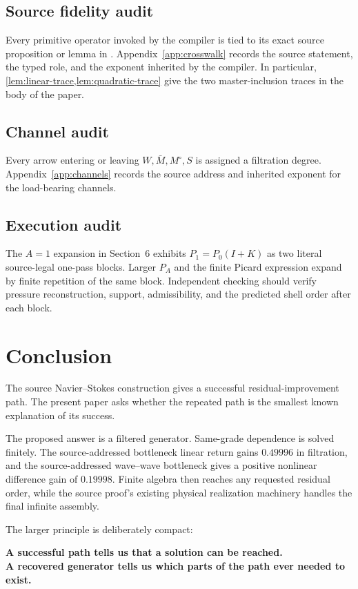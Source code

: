 \documentclass[11pt]{article}
\numberwithin{equation}{section}
\theoremstyle{highend}
\theoremstyle{definition}
\begin{document}
\subsection{Source fidelity audit}
Every primitive operator invoked by the compiler is tied to its exact source proposition or lemma in \cite{OpenAI2026NS}. Appendix~\ref{app:crosswalk} records the source statement, the typed role, and the exponent inherited by the compiler. In particular, \cref{lem:linear-trace,lem:quadratic-trace} give the two master-inclusion traces in the body of the paper.

\subsection{Channel audit}
Every arrow entering or leaving $W,\bar M,M^\circ,S$ is assigned a filtration degree. Appendix~\ref{app:channels} records the source address and inherited exponent for the load-bearing channels.

\subsection{Execution audit}
The $A=1$ expansion in Section~6 exhibits $P_1=P_0(I+K)$ as two literal source-legal one-pass blocks. Larger $P_A$ and the finite Picard expression expand by finite repetition of the same block. Independent checking should verify pressure reconstruction, support, admissibility, and the predicted shell order after each block.

\section{Conclusion}
The source Navier--Stokes construction gives a successful residual-improvement path. The present paper asks whether the repeated path is the smallest known explanation of its success.

The proposed answer is a filtered generator. Same-grade dependence is solved finitely. The source-addressed bottleneck linear return gains $0.49996$ in filtration, and the source-addressed wave--wave bottleneck gives a positive nonlinear difference gain of $0.19998$. Finite algebra then reaches any requested residual order, while the source proof's existing physical realization machinery handles the final infinite assembly.

The larger principle is deliberately compact:
\begin{keybox}
\centering
\textbf{A successful path tells us that a solution can be reached.\\
A recovered generator tells us which parts of the path ever needed to exist.}
\end{keybox}
\end{document}
